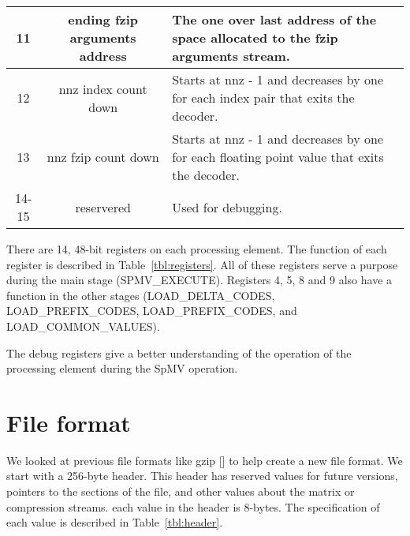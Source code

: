 \begin{table}
\begin{tabular}{|c|c|m{8cm}|}
        \hline
        11 & ending fzip arguments address & The one over last address of the space allocated to the fzip arguments stream.\\
        \hline
        12 & nnz index count down & Starts at nnz - 1 and decreases by one for each index pair that exits the decoder.\\
        \hline
        13 & nnz fzip count down & Starts at nnz - 1 and decreases by one for each floating point value that exits the decoder.\\
        \hline
        14-15 & reservered & Used for debugging.\\
        \hline
    \end{tabular}

\end{table}

There are 14, 48-bit registers on each processing element. The function of each register is described in Table~\ref{tbl:registers}. All of these registers serve a purpose during the main stage (SPMV\_EXECUTE). Registers 4, 5, 8 and 9 also have a function in the other stages (LOAD\_DELTA\_CODES, LOAD\_PREFIX\_CODES, LOAD\_PREFIX\_CODES, and LOAD\_COMMON\_VALUES).

The debug registers give a better understanding of the operation of the processing element during the SpMV operation.

\section{File format}
We looked at previous file formats like gzip [\cite{prelim:deutsch}] to help create a new file format. We start with a 256-byte header. This header has reserved values for future versions, pointers to the sections of the file, and other values about the matrix or compression streams. each value in the header is 8-bytes. The specification of each value is described in Table~\ref{tbl:header}.

